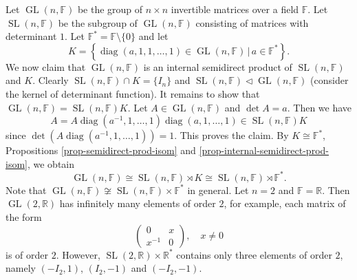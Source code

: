 \begin{example}
	Let $\operatorname{GL}(n,\mathbb{F})$ be the group of $n\times n$ invertible matrices over a field $\mathbb{F}$. Let $\operatorname{SL}(n,\mathbb{F})$ be the subgroup of $\operatorname{GL}(n,\mathbb{F})$ consisting of matrices with determinant $1$. Let $\mathbb{F}^* = \mathbb{F}\setminus \{0\}$ and let
	\begin{equation*}
		K = \left\{ \operatorname{diag}(a,1,1,\dots, 1)\in \operatorname{GL}(n,\mathbb{F}) \,|\, a\in\mathbb{F}^*\right\}.
	\end{equation*}
	We now claim that $\operatorname{GL}(n,\mathbb{F})$ is an internal semidirect product of $\operatorname{SL}(n,\mathbb{F})$ and $K$. Clearly $\operatorname{SL}(n,\mathbb{F})\cap K = \{I_n\}$ and $\operatorname{SL}(n,\mathbb{F}) \lhd \operatorname{GL}(n,\mathbb{F})$ (consider the kernel of determinant function). It remains to show that $\operatorname{GL}(n,\mathbb{F}) = \operatorname{SL}(n,\mathbb{F})K$. Let $A\in \operatorname{GL}(n,\mathbb{F})$ and $\det A = a$. Then we have 
	\begin{equation*}
		A = A\operatorname{diag}(a^{-1},1,\dots, 1)\operatorname{diag}(a,1,\dots, 1) \in \operatorname{SL}(n,\mathbb{F})K
	\end{equation*}
	since $\det (A\operatorname{diag}(a^{-1},1,\dots, 1)) = 1$. This proves the claim. By $K \cong \mathbb{F}^*$, Propositions \ref{prop-semidirect-prod-isom} and \ref{prop-internal-semidirect-prod-isom}, we obtain
	\begin{equation*}
		\operatorname{GL}(n,\mathbb{F}) \cong \operatorname{SL}(n,\mathbb{F})\rtimes K \cong \operatorname{SL}(n,\mathbb{F})\rtimes\mathbb{F}^*.
	\end{equation*}
	Note that $\operatorname{GL}(n,\mathbb{F}) \not\cong \operatorname{SL}(n,\mathbb{F})\times\mathbb{F}^*$ in general. Let $n = 2$ and $\mathbb{F} = \mathbb{R}$. Then $\operatorname{GL}(2,\mathbb{R})$ has infinitely many elements of order $2$, for example, each matrix of the form
	\begin{equation*}
		\begin{pmatrix}
			0 & x\\
			x^{-1} & 0
		\end{pmatrix},\quad x\neq 0
	\end{equation*}
	is of order $2$. However, $\operatorname{SL}(2,\mathbb{R})\times\mathbb{R}^*$  contains only three elements of order $2$, namely $(-I_2,1)$, $(I_2, -1)$ and $(-I_2,-1)$.
\end{example}

